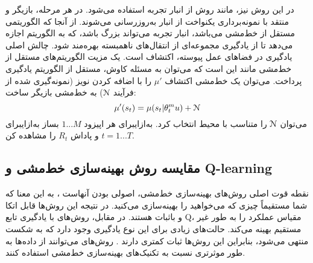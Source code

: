 در این روش نیز، مانند روش 
از انبار تجربه استفاده می‌شود. 
در هر مرحله، بازیگر و منتقد با نمونه‌برداری یکنواخت از انبار به‌روزرسانی می‌شوند. از آنجا که 
الگوریتمی مستقل از خط‌مشی می‌باشد، انبار تجربه می‌تواند بزرگ باشد، که به الگوریتم اجازه می‌دهد تا از یادگیری مجموعه‌ای از انتقال‌های ناهمبسته بهره‌مند شود.
چالش اصلی یادگیری در فضاهای عمل پیوسته، اکتشاف است. یک مزیت  الگوریتم‌های مستقل از خط‌مشی مانند 
این است که می‌توان به مسئله کاوش، مستقل از الگوریتم یادگیری پرداخت.
می‌توان یک خط‌مشی اکتشاف 
$\mu'$
را با اضافه کردن نویز (نمونه‌گیری شده از فرآیند $\EuScript{N}$) به خط‌مشی بازیگر ساخت:
\begin{equation}
\mu'(s_t) = \mu(s_t|\theta_t^mu) + \EuScript{N}
\end{equation}
می‌توان $\EuScript{N}$ 
را متناسب با محیط انتخاب کرد.
\‌به‌ازای{برای هر اپیزود $1...M$}
 بساز
\‌به‌ازای{برای $t=1...T$}
 و پاداش $R_t$ را مشاهده کن.

\subsection{مقایسه روش بهینه‌سازی خط‌مشی و Q-learning}
نقطه قوت اصلی روش‌های بهینه‌سازی خط‌مشی، اصولی بودن آنهاست ، به این معنا که شما مستقیماً چیزی که می‌خواهید را بهینه‌سازی می‌کنید. در نتیجه این روش‌ها قابل اتکا و باثبات هستند. در مقابل، روش‌های 
با یادگیری تابع Q، مقیاس عملکرد را به طور غیر مستقیم بهینه می‌کند. حالت‌های زیادی برای این نوع یادگیری وجود دارد که به شکست منتهی می‌شود، بنابراین این روش‌ها  ثبات کمتری دارند 
\cite{suttonbook}.
روش‌های 
 می‌توانند از داده‌ها به طور موثرتری نسبت به تکنیک‌های بهینه‌سازی خط‌مشی استفاده کنند.
